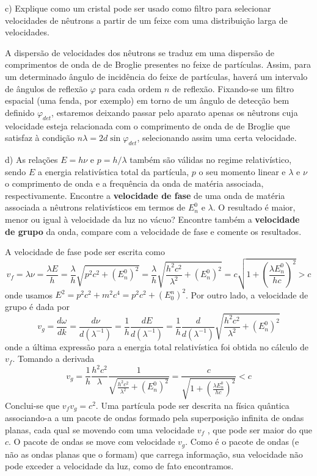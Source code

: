 \begin{enumerate}[start=1,label={\bfseries Q\arabic*.}]
c) Explique como um cristal pode ser usado como filtro para selecionar velocidades de nêutrons a partir de um feixe com uma distribuição larga de velocidades.

\resposta A dispersão de velocidades dos nêutrons se traduz em uma dispersão de comprimentos de onda de de Broglie presentes no feixe de partículas. Assim, para um determinado ângulo de incidência do feixe de partículas, haverá um intervalo de ângulos de reflexão $\varphi$ para cada ordem $n$ de reflexão. Fixando-se um filtro espacial (uma fenda, por exemplo) em torno de um ângulo de detecção bem definido $\varphi_{det}$, estaremos deixando passar pelo aparato apenas os nêutrons cuja velocidade esteja relacionada com o comprimento de onda de de Broglie que satisfaz à condição $n\lambda = 2d \sin \varphi_{det}$, selecionando assim uma certa velocidade.


d) As relações $E = h\nu$ e $p = h/\lambda$ também são válidas no regime relativístico, sendo $E$ a energia relativística total da partícula, $p$ o seu momento linear e $\lambda$ e $\nu$ o comprimento de onda e a frequência da onda de matéria associada, respectivamente. Encontre a \textbf{velocidade de fase} de uma onda de matéria associada a nêutrons relativísticos em termos de $E_{n}^{0}$ e $\lambda$. O resultado é maior, menor ou igual à velocidade da luz no vácuo? Encontre também a \textbf{velocidade de grupo} da onda, compare com a velocidade de fase e comente os resultados.

\resposta A velocidade de fase pode ser escrita como
$$
v_{f}=\lambda \nu=\frac{\lambda E}{h}=\frac{\lambda}{h} \sqrt{p^{2} c^{2}+\left(E_{n}^{0}\right)^{2}}=\frac{\lambda}{h} \sqrt{\frac{h^{2} c^{2}}{\lambda^{2}}+\left(E_{n}^{0}\right)^{2}}=c \sqrt{1+\left(\frac{\lambda E_{n}^{0}}{h c}\right)^{2}}>c
$$
onde usamos $E^{2} = p^{2}c^{2} + m^{2}c^{4} = p^{2}c^{2} + (E_{0}^{n})^{2}$. Por outro lado, a velocidade de grupo é dada por
$$
v_{g}=\frac{d \omega}{d k}=\frac{d \nu}{d\left(\lambda^{-1}\right)}=\frac{1}{h} \frac{d E}{d\left(\lambda^{-1}\right)}=\frac{1}{h} \frac{d}{d\left(\lambda^{-1}\right)} \sqrt{\frac{h^{2} c^{2}}{\lambda^{2}}+\left(E_{n}^{0}\right)^{2}}
$$
onde a última expressão para a energia total relativística foi obtida no cálculo de $v_{f}$. Tomando a derivada
$$
v_{g}=\frac{1}{h} \frac{h^{2} c^{2}}{\lambda} \frac{1}{\sqrt{\frac{h^{2} c^{2}}{\lambda^{2}}+\left(E_{n}^{0}\right)^{2}}}=\frac{c}{\sqrt{1+\left(\frac{\lambda E_{n}^{0}}{h c}\right)^{2}}}<c
$$
Conclui-se que $v_{f}v_{g} = c^{2}$. Uma partícula pode ser descrita na física quântica associando-a a um pacote de ondas formado pela superposição infinita de ondas planas, cada qual se movendo com uma velocidade $v_{f}$ , que pode ser maior do que $c$. O pacote de ondas se move com velocidade $v_{g}$. Como é o pacote de ondas (e não as ondas planas que o formam) que carrega informação, sua velocidade não pode exceder a velocidade da luz, como de fato encontramos.





\end{enumerate}
